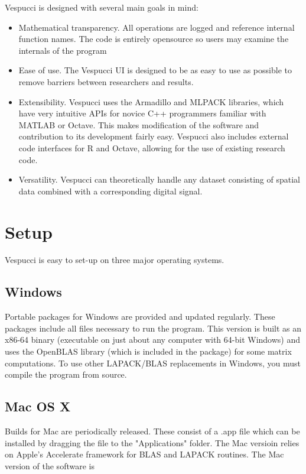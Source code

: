 \documentclass[12pt]{achemso} %
\begin{document}
Vespucci is designed with several main goals in mind: \begin{itemize} \item
Mathematical transparency. All operations are logged and reference internal
function names. The code is entirely opensource so users may examine the
internals of the program \item Ease of use. The Vespucci UI is designed to be as
easy to use as possible to remove barriers between researchers and results.
\item Extensibility. Vespucci uses the Armadillo and MLPACK libraries, which
have very intuitive APIs for novice C++ programmers familiar with MATLAB or
Octave. This makes modification of the software and contribution to its
development fairly easy. Vespucci also includes external code interfaces for R
and Octave, allowing for the use of existing research code. \item Versatility.
Vespucci can theoretically handle any dataset consisting of spatial data
combined with a corresponding digital signal. \end{itemize}


\section{Setup} 
Vespucci is easy to set-up on three major operating systems.

\subsection{Windows} Portable packages for Windows are provided and updated
regularly. These packages include all files necessary to run the program. This
version is built as an x86-64 binary (executable on just about any computer with
64-bit Windows) and uses the OpenBLAS library (which is included in the package)
for some matrix computations. To use other LAPACK/BLAS replacements in Windows,
you must compile the program from source.

\subsection{Mac OS X} Builds for Mac are periodically released. These consist of
a .app file which can be installed by dragging the file to the "Applications"
folder. The Mac versioin relies on Apple's Accelerate framework for BLAS and
LAPACK routines. The Mac version of the software is
\end{document}
